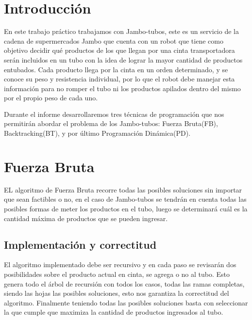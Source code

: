 \documentclass[10pt,a4paper]{article}
\begin{document}

\subtitulo{}

\fecha{\today}



\maketitle

\tableofcontents

\newpage

\setcounter{page}{1}

\section{Introducción} \label{sec:introduccion}
En este trabajo práctico trabajamos con Jambo-tubos, este es un servicio de la cadena de supermercados Jambo que cuenta con un robot que tiene como objetivo decidir qué productos de los que llegan por una cinta transportadora serán incluidos en un tubo con la idea de lograr la mayor cantidad de productos entubados. Cada producto llega por la cinta en un orden determinado, y se conoce su peso y resistencia individual, por lo que el robot debe manejar esta información para no romper el tubo ni los productos apilados dentro del mismo por el propio peso de cada uno. \cite{ref:enunciado}

Durante el informe desarrollaremos tres técnicas de programación que nos permitirán abordar el problema de los Jambo-tubos: Fuerza Bruta(FB), Backtracking(BT), y por último Programación Dinámica(PD).

\section{Fuerza Bruta} \label{sec:fuerza_bruta}
EL algoritmo de Fuerza Bruta recorre todas las posibles soluciones sin importar que sean factibles o no, en el caso de Jambo-tubos se tendrán en cuenta todas las posibles formas de meter los productos en el tubo, luego se determinará cuál es la cantidad máxima de productos que se pueden ingresar.

\subsection{Implementación y correctitud}
El algoritmo implementado debe ser recursivo y en cada paso se revisarán dos posibilidades sobre el producto actual en cinta, se agrega o no al tubo. Esto genera todo el árbol de recursión con todos los casos, todas las ramas completas, siendo las hojas las posibles soluciones, esto nos garantiza la correctitud del algoritmo. Finalmente teniendo todas las posibles soluciones basta con seleccionar la que cumple que maximiza la cantidad de productos ingresados al tubo.
\end{document}
